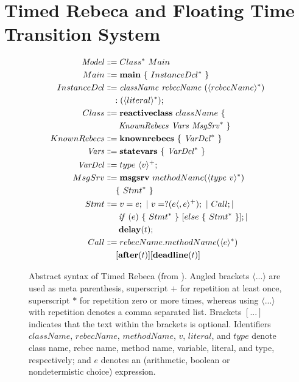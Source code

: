 \section{Timed Rebeca and Floating Time Transition System} \label{sec::FTTS}


\begin{figure}[!htbp]
 	\begin{center}
 		\small
 		\begin{mdframed}
 			\begin{align*}
 				\mathit{Model} &\Coloneqq  Class^* ~ Main \qquad \\
 				Main &\Coloneqq \mathbf{main} ~ \{ ~ InstanceDcl^* ~ \} \qquad \\
 				InstanceDcl &\Coloneqq \mathit{className} ~ \mathit{rebecName}~(\langle rebecName \rangle ^*) \\
 							& ~~~ : (\langle literal \rangle ^*);\\
 				Class &\Coloneqq \mathbf{reactiveclass} ~ className ~ \{ \\
 					  &\ ~~~ ~ \mathit{KnownRebecs} ~ \mathit{Vars} ~ \mathit{MsgSrv}^* ~ \}\\
 				KnownRebecs &\Coloneqq \mathbf{knownrebecs} ~ \{ ~ \mathit{VarDcl}^* ~ \} ~ \\
 				\mathit{Vars} &\Coloneqq \mathbf{statevars} ~ \{ ~ \mathit{VarDcl}^* ~ \} ~ \\
 				\mathit{VarDcl} &\Coloneqq type ~ \langle v \rangle ^+;\\
 				MsgSrv &\Coloneqq \mathbf{msgsrv} ~ methodName(\langle type ~ v \rangle ^*) ~\\
				             &\ ~~~  \{ ~ Stmt^* ~ \} \\
 				Stmt &\Coloneqq v = e; ~| ~ v = ?(e\langle ,e \rangle^+); ~| ~ Call;| ~ \\
 					 &\ ~~~  ~ {\it if} ~ (e) ~ \{ ~ Stmt^* ~ \} ~ [else ~ \{ ~ Stmt^* ~ \}]; |   \\
					 &\ ~~~ ~ \mathbf{delay}(t); \\
 				Call &\Coloneqq rebecName.methodName(\langle e \rangle ^*) \\
 					 &\ ~~~  [\mathbf{after}(t)]  [\mathbf{deadline}(t)]\\
 			\end{align*}
 		\end{mdframed}
 		\caption{Abstract syntax of Timed Rebeca (from \cite{DBLP:journals/scp/KhamespanahSSKI15}). Angled brackets $\langle$...$\rangle$ are used as meta parenthesis, superscript $+$ for repetition at least once, superscript $*$ for repetition zero or more times, whereas using $\langle$...$\rangle$ with repetition denotes a comma separated list. Brackets $[...]$ indicates that the text within the brackets is optional. Identifiers $className$, $rebecName$, $methodName$, $v$, $literal$, and $type$ denote class name, rebec name, method name, variable, literal, and type, respectively; and $e$ denotes an (arithmetic, boolean or nondetermistic choice) expression.
}
\end{center}
\end{figure}
